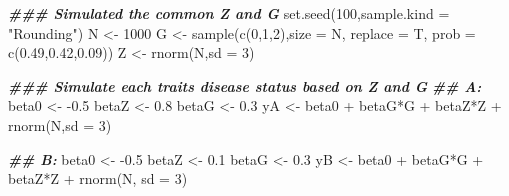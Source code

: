 \documentclass[
]{article}
\newenvironment{Shaded}{\begin{snugshade}}{\end{snugshade}}
\newcommand{\AttributeTok}[1]{\textcolor[rgb]{0.77,0.63,0.00}{#1}}
\newcommand{\DecValTok}[1]{\textcolor[rgb]{0.00,0.00,0.81}{#1}}
\newcommand{\DocumentationTok}[1]{\textcolor[rgb]{0.56,0.35,0.01}{\textbf{\textit{#1}}}}
\newcommand{\FloatTok}[1]{\textcolor[rgb]{0.00,0.00,0.81}{#1}}
\newcommand{\FunctionTok}[1]{\textcolor[rgb]{0.00,0.00,0.00}{#1}}
\newcommand{\NormalTok}[1]{#1}
\newcommand{\OtherTok}[1]{\textcolor[rgb]{0.56,0.35,0.01}{#1}}
\newcommand{\SpecialCharTok}[1]{\textcolor[rgb]{0.00,0.00,0.00}{#1}}
\newcommand{\StringTok}[1]{\textcolor[rgb]{0.31,0.60,0.02}{#1}}
\begin{document}
\begin{Shaded}
\begin{Highlighting}[]
\DocumentationTok{\#\#\# Simulated the common Z and G}
\FunctionTok{set.seed}\NormalTok{(}\DecValTok{100}\NormalTok{,}\AttributeTok{sample.kind =} \StringTok{"Rounding"}\NormalTok{)}
\NormalTok{N }\OtherTok{\textless{}{-}} \DecValTok{1000}
\NormalTok{G }\OtherTok{\textless{}{-}} \FunctionTok{sample}\NormalTok{(}\FunctionTok{c}\NormalTok{(}\DecValTok{0}\NormalTok{,}\DecValTok{1}\NormalTok{,}\DecValTok{2}\NormalTok{),}\AttributeTok{size =}\NormalTok{ N, }\AttributeTok{replace =}\NormalTok{ T, }\AttributeTok{prob =} \FunctionTok{c}\NormalTok{(}\FloatTok{0.49}\NormalTok{,}\FloatTok{0.42}\NormalTok{,}\FloatTok{0.09}\NormalTok{))}
\NormalTok{Z }\OtherTok{\textless{}{-}} \FunctionTok{rnorm}\NormalTok{(N,}\AttributeTok{sd =} \DecValTok{3}\NormalTok{)}

\DocumentationTok{\#\#\# Simulate each trait\textquotesingle{}s disease status based on Z and G}
\DocumentationTok{\#\# A:}
\NormalTok{beta0 }\OtherTok{\textless{}{-}} \SpecialCharTok{{-}}\FloatTok{0.5}
\NormalTok{betaZ }\OtherTok{\textless{}{-}} \FloatTok{0.8}
\NormalTok{betaG }\OtherTok{\textless{}{-}} \FloatTok{0.3}
\NormalTok{yA }\OtherTok{\textless{}{-}}\NormalTok{ beta0 }\SpecialCharTok{+}\NormalTok{ betaG}\SpecialCharTok{*}\NormalTok{G }\SpecialCharTok{+}\NormalTok{ betaZ}\SpecialCharTok{*}\NormalTok{Z }\SpecialCharTok{+} \FunctionTok{rnorm}\NormalTok{(N,}\AttributeTok{sd =} \DecValTok{3}\NormalTok{)}

\DocumentationTok{\#\# B:}
\NormalTok{beta0 }\OtherTok{\textless{}{-}} \SpecialCharTok{{-}}\FloatTok{0.5}
\NormalTok{betaZ }\OtherTok{\textless{}{-}} \FloatTok{0.1}
\NormalTok{betaG }\OtherTok{\textless{}{-}} \FloatTok{0.3}
\NormalTok{yB }\OtherTok{\textless{}{-}}\NormalTok{ beta0 }\SpecialCharTok{+}\NormalTok{ betaG}\SpecialCharTok{*}\NormalTok{G }\SpecialCharTok{+}\NormalTok{ betaZ}\SpecialCharTok{*}\NormalTok{Z }\SpecialCharTok{+} \FunctionTok{rnorm}\NormalTok{(N, }\AttributeTok{sd =} \DecValTok{3}\NormalTok{)}


\end{Highlighting}
\end{Shaded}
\end{document}
